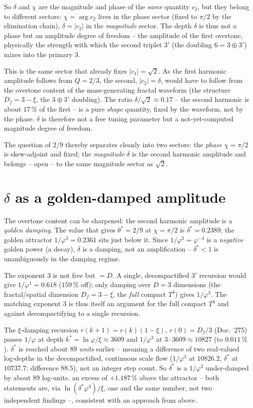 So $\delta$ and $\chi$ are the magnitude and phase of the \emph{same} quantity $c_2$, but they
belong to different sectors: $\chi=\arg c_2$ lives in the phase sector (fixed to $\pi/2$ by the
elimination chain), $\delta=|c_2|$ in the \emph{magnitude} sector. The depth $\delta$ is thus not
a phase but an amplitude degree of freedom -- the amplitude of the first overtone, physically the
strength with which the second triplet $3'$ (the doubling $6=3\oplus3'$) mixes into the primary
$3$.

This is the same sector that already fixes $|c_1|=\sqrt2$. As the first harmonic amplitude
follows from $Q=2/3$, the second, $|c_2|=\delta$, would have to follow from the overtone content
of the mass-generating fractal waveform (the structure $D_f=3-\xi$, the $3\oplus3'$ doubling).
The ratio $\delta/\sqrt2\approx0.17$ -- the second harmonic is about $17\,\%$ of the first -- is a
pure \emph{shape} quantity, fixed by the waveform, not by the phase. $\delta$ is therefore not a
free tuning parameter but a not-yet-computed magnitude degree of freedom.

The question of $2/9$ thereby separates cleanly into two sectors: the \emph{phase} $\chi=\pi/2$
is skew-adjoint and fixed; the \emph{magnitude} $\delta$ is the second harmonic amplitude and
belongs -- open -- to the same magnitude sector as $\sqrt2$.

\section{$\delta$ as a golden-damped amplitude}
The overtone content can be sharpened: the second harmonic amplitude is a \emph{golden
damping}. The value that gives $\theta^*=2/9$ at $\chi=\pi/2$ is $\delta^*=0.2389$; the golden
attractor $1/\varphi^3=0.2361$ sits just below it. Since $1/\varphi^3=\varphi^{-3}$ is a
\emph{negative} golden power (a decay), $\delta$ is a damping, not an amplification --
$\delta^*<1$ is unambiguously in the damping regime.

The exponent $3$ is not free but $=D$. A single, decompactified $3'$ recursion would give
$1/\varphi^1=0.618$ ($159\,\%$ off); only damping over $D=3$ dimensions (the fractal/spatial
dimension $D_f=3-\xi$, the \emph{full} compact $T^4$) gives $1/\varphi^3$. The matching
exponent $3$ is thus itself an argument for the full compact $T^4$ and against decompactifying
to a single recursion.

The $\xi$-damping recursion $r(k{+}1)=r(k)(1-\xi)$, $r(0)=D_f/3$ (Doc.~275) passes $1/\varphi$
at depth $k^*=\ln\varphi/\xi\approx3609$ and $1/\varphi^3$ at $3\cdot3609\approx10827$ (to
$0.011\,\%$). $\delta^*$ is reached about $89$ \emph{units} earlier -- meaning a difference of
two real-valued log-depths in the decompactified, continuous scale flow ($1/\varphi^3$ at
$10826.2$, $\delta^*$ at $10737.7$; difference $88.5$), not an integer step count. So $\delta^*$
is a $1/\varphi^3$ under-damped by about $89$ log-units, an excess of $+1.187\,\%$ above the
attractor -- both statements are, via $\ln(\delta^*\varphi^{3})/\xi$, one and the same number,
not two independent findings --, consistent with an approach from above.

